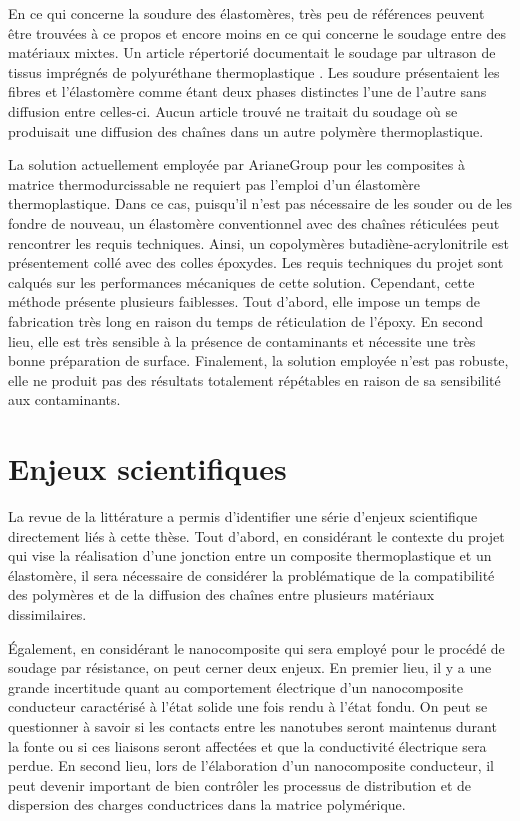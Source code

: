 \FloatBarrier
En ce qui concerne la soudure des élastomères, très peu de références peuvent être trouvées à ce propos et encore moins en ce qui concerne le soudage entre des matériaux mixtes. 
Un article répertorié documentait le soudage par ultrason de tissus imprégnés de polyuréthane thermoplastique \cite{Hollande1998}. 
Les soudure présentaient les fibres et l'élastomère comme étant deux phases distinctes l'une de l'autre sans diffusion entre celles-ci. 
Aucun article trouvé ne traitait du soudage où se produisait une diffusion des chaînes dans un autre polymère thermoplastique. 

La solution actuellement employée par ArianeGroup pour les composites à matrice thermodurcissable ne requiert pas l'emploi d'un élastomère thermoplastique. 
Dans ce cas, puisqu'il n'est pas nécessaire de les souder ou de les fondre de nouveau, un élastomère conventionnel avec des chaînes réticulées peut rencontrer les requis techniques. 
Ainsi, un copolymères butadiène-acrylonitrile est présentement collé avec des colles époxydes. 
Les requis techniques du projet sont calqués sur les performances mécaniques de cette solution. 
Cependant, cette méthode présente plusieurs faiblesses. 
Tout d'abord, elle impose un temps de fabrication très long en raison du temps de réticulation de l'époxy. 
En second lieu, elle est très sensible à la présence de contaminants et nécessite une très bonne préparation de surface. 
Finalement, la solution employée n'est pas robuste, elle ne produit pas des résultats totalement répétables en raison de sa sensibilité aux contaminants. 

\section{Enjeux scientifiques}

La revue de la littérature a permis d'identifier une série d'enjeux scientifique directement liés à cette thèse. 
Tout d'abord, en considérant le contexte du projet qui vise la réalisation d'une jonction entre un composite thermoplastique et un élastomère, il sera nécessaire de considérer la problématique de la compatibilité des polymères et de la diffusion des chaînes entre plusieurs matériaux dissimilaires. 

Également, en considérant le nanocomposite qui sera employé pour le procédé de soudage par résistance, on peut cerner deux enjeux. 
En premier lieu, il y a une grande incertitude quant au comportement électrique d'un nanocomposite conducteur caractérisé à l'état solide une fois rendu à l'état fondu. 
On peut se questionner à savoir si les contacts entre les nanotubes seront maintenus durant la fonte ou si ces liaisons seront affectées et que la conductivité électrique sera perdue. 
En second lieu, lors de l'élaboration d'un nanocomposite conducteur, il peut devenir important de bien contrôler les processus de distribution et de dispersion des charges conductrices dans la matrice polymérique. 




